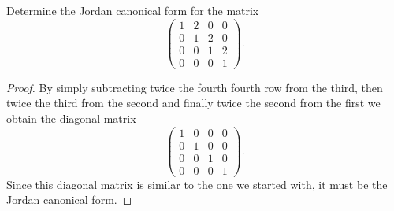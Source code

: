 \documentclass[10pt]{amsart}
\begin{document}
\begin{thm}
  \label{Ex2}
  Determine the Jordan canonical form for the matrix
  \[\begin{pmatrix}
    1 & 2 & 0 & 0\\
    0 & 1 & 2 & 0\\
    0 & 0 & 1 & 2\\
    0 & 0 & 0 & 1
  \end{pmatrix}.\]
  \begin{proof}
    By simply subtracting twice the fourth fourth row from the third, then twice the third from the second and finally twice the second from the first we obtain the diagonal matrix
    \[\begin{pmatrix}
      1 & 0 & 0 & 0\\
      0 & 1 & 0 & 0\\
      0 & 0 & 1 & 0\\
      0 & 0 & 0 & 1
    \end{pmatrix}.\]
    Since this diagonal matrix is similar to the one we started with, it must be the Jordan canonical form.
  \end{proof}
\end{thm}
\end{document}
